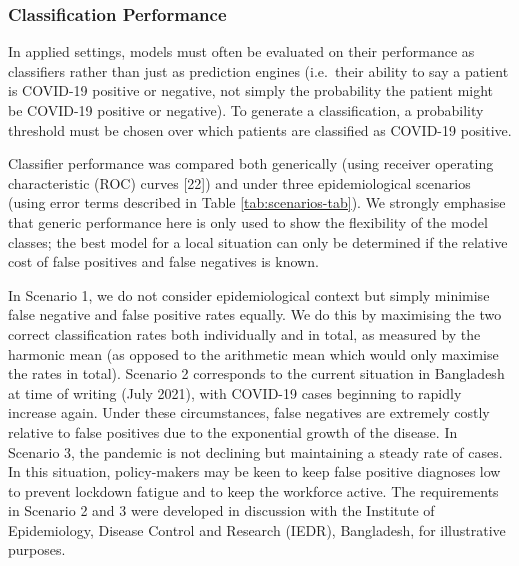\documentclass[]{elsarticle} %
\begin{document}
\hypertarget{classification-performance}{%
\subsubsection{Classification Performance}\label{classification-performance}}

In applied settings, models must often be evaluated on their performance as classifiers rather than just as prediction engines (i.e.~their ability to say a patient is COVID-19 positive or negative, not simply the probability the patient might be COVID-19 positive or negative).
To generate a classification, a probability threshold must be chosen over which patients are classified as COVID-19 positive.

Classifier performance was compared both generically (using receiver operating characteristic (ROC) curves {[}22{]}) and under three epidemiological scenarios (using error terms described in Table \ref{tab:scenarios-tab}).
We strongly emphasise that generic performance here is only used to show the flexibility of the model classes; the best model for a local situation can only be determined if the relative cost of false positives and false negatives is known.

In Scenario 1, we do not consider epidemiological context but simply minimise false negative and false positive rates equally.
We do this by maximising the two correct classification rates both individually and in total, as measured by the harmonic mean (as opposed to the arithmetic mean which would only maximise the rates in total).
Scenario 2 corresponds to the current situation in Bangladesh at time of writing (July 2021), with COVID-19 cases beginning to rapidly increase again.
Under these circumstances, false negatives are extremely costly relative to false positives due to the exponential growth of the disease.
In Scenario 3, the pandemic is not declining but maintaining a steady rate of cases.
In this situation, policy-makers may be keen to keep false positive diagnoses low to prevent lockdown fatigue and to keep the workforce active.
The requirements in Scenario 2 and 3 were developed in discussion with the Institute of Epidemiology, Disease Control and Research (IEDR), Bangladesh, for illustrative purposes.
\end{document}
